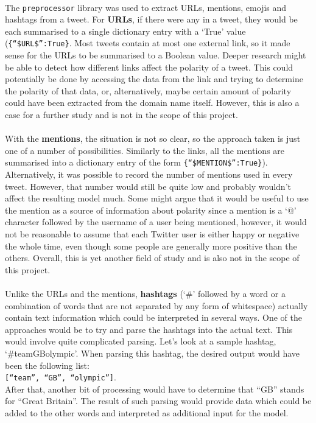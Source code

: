 \paragraph{}
The \texttt{preprocessor} library was used to extract URLs, mentions, emojis and hashtags from a tweet. For \textbf{URLs}, if there were any in a tweet, they would be each summarised to a single dictionary entry with a `True' value (\texttt{\{``\$URL\$'':True\}}. Most tweets contain at most one external link, so it made sense for the URLs to be summarised to a Boolean value. Deeper research might be able to detect how different links affect the polarity of a tweet. This could potentially be done by accessing the data from the link and trying to determine the polarity of that data, or, alternatively, maybe certain amount of polarity could have been extracted from the domain name itself. However, this is also a case for a further study and is not in the scope of this project. 
\paragraph{}
With the \textbf{mentions}, the situation is not so clear, so the approach taken is just one of a number of possibilities. Similarly to the links, all the mentions are summarised into a dictionary entry of the form \texttt{\{``\$MENTION\$'':True\}}). Alternatively, it was possible to record the number of mentions used in every tweet. However, that number would still be quite low and probably wouldn't affect the resulting model much. Some might argue that it would be useful to use the mention as a source of information about polarity since a mention is a `@' character followed by the username of a user being mentioned, however, it would not be reasonable to assume that each Twitter user is either happy or negative the whole time, even though some people are generally more positive than the others. Overall, this is yet another field of study and is also not in the scope of this project.
\paragraph{}
Unlike the URLs and the mentions, \textbf{hashtags} (`\#' followed by a word or a combination of words that are not separated by any form of whitespace) actually contain text information which could be interpreted in several ways. One of the approaches would be to try and parse the hashtags into the actual text. This would involve quite complicated parsing. Let's look at a sample hashtag, `\#teamGBolympic'. When parsing this hashtag, the desired output would have been the following list: \\ \texttt{[``team'', ``GB'', ``olympic'']}.\\ After that, another bit of processing would have to determine that ``GB'' stands for ``Great Britain''. The result of such parsing would provide data which could be added to the other words and interpreted as additional input for the model. 

